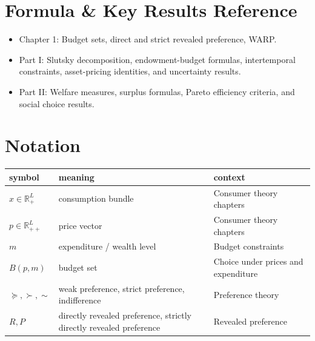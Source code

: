 \documentclass[12pt]{article}
\begin{document}

\newpage

\newpage

\newpage

\newpage

\newpage

\newpage

\newpage

\newpage

\newpage

\newpage

\newpage










\appendix

\section{Formula \& Key Results Reference}
\begin{itemize}
    \item Chapter 1: Budget sets, direct and strict revealed preference, WARP.
    \item Part I: Slutsky decomposition, endowment-budget formulas, intertemporal constraints, asset-pricing identities, and uncertainty results.
    \item Part II: Welfare measures, surplus formulas, Pareto efficiency criteria, and social choice results.
\end{itemize}

\section{Notation}
\renewcommand{\arraystretch}{1.2}
\begin{center}
\begin{tabular}{|p{2.2cm}|p{5.0cm}|p{6.0cm}|}
\hline
\textbf{symbol} & \textbf{meaning} & \textbf{context} \\
\hline
$x \in \mathbb{R}^L_+$ & consumption bundle & Consumer theory chapters \\
\hline
$p \in \mathbb{R}^L_{++}$ & price vector & Consumer theory chapters \\
\hline
$m$ & expenditure / wealth level & Budget constraints \\
\hline
$B(p,m)$ & budget set & Choice under prices and expenditure \\
\hline
$\succeq, \succ, \sim$ & weak preference, strict preference, indifference & Preference theory \\
\hline
$R, P$ & directly revealed preference, strictly directly revealed preference & Revealed preference \\
\hline
\end{tabular}
\end{center}
\end{document}
